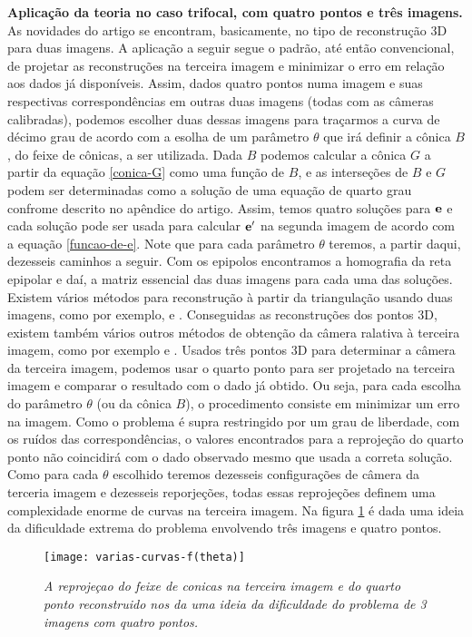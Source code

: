 {\bf Aplicação da teoria no caso trifocal, com quatro pontos e três imagens.} As novidades do artigo se encontram, basicamente, no tipo de reconstrução 3D para duas imagens. A aplicação a seguir segue o padrão, até então convencional, de projetar as reconstruções na terceira imagem e minimizar o erro em relação aos dados já disponíveis. Assim, dados quatro pontos numa imagem e suas respectivas correspondências em outras duas imagens (todas com as câmeras calibradas), podemos escolher duas dessas imagens para traçarmos a curva de décimo grau de acordo com a esolha de um parâmetro $\theta$ que irá definir a cônica $B$, do feixe de cônicas, a ser utilizada.  Dada $B$ podemos calcular a cônica $G$ a partir da equação \ref{conica-G} como uma função de $B$, e as interseções de $B$ e $G$ podem ser determinadas como a solução de uma equação de quarto grau confrome descrito no apêndice do artigo. Assim, temos quatro soluções para   ${\bf e}$ e cada solução pode ser usada para calcular ${\bf e'}$ na segunda imagem de acordo com a equação \ref{funcao-de-e}. Note que para cada parâmetro $\theta$ teremos, a partir daqui, dezesseis caminhos a seguir. Com os epipolos encontramos a homografia da reta epipolar  e daí, a matriz essencial das duas imagens para cada uma das soluções. Existem vários métodos para reconstrução à partir da triangulação usando duas imagens, como por exemplo, \cite{nister5p2v} e \cite{Fabbri:Kimia:IJCV2015}. Conseguidas as reconstruções dos pontos 3D, existem também vários outros métodos de obtenção da câmera ralativa à terceira imagem, como por exemplo \cite{haralick} e \cite{bib:kuang}. Usados três pontos 3D para determinar a câmera da terceira imagem, podemos usar o quarto ponto para ser projetado na terceira imagem e comparar o resultado com o dado já obtido. Ou seja, para cada escolha do parâmetro $\theta$ (ou da cônica $B$), o procedimento consiste em minimizar um erro na imagem. Como o problema é supra restringido por um grau de liberdade, com os ruídos das correspondências, o valores encontrados para a reprojeção do quarto ponto não coincidirá com o dado observado mesmo que usada a correta solução. Como para cada $\theta$ escolhido teremos dezesseis configurações de câmera da terceria imagem e dezesseis reporjeções, todas essas reprojeções definem uma complexidade enorme de curvas na terceira imagem. Na figura \ref{curvas-f(theta)} é dada uma ideia da dificuldade extrema do problema envolvendo três imagens e quatro pontos. 

\begin{figure}[!htb]
\centering
\texttt{[image: varias-curvas-f(theta)]}
\caption{\textit{A reprojeçao do feixe de conicas na terceira imagem e do quarto ponto reconstruido nos da uma ideia da dificuldade do problema de 3 imagens com quatro pontos.}}
\label{curvas-f(theta)}
\end{figure}

